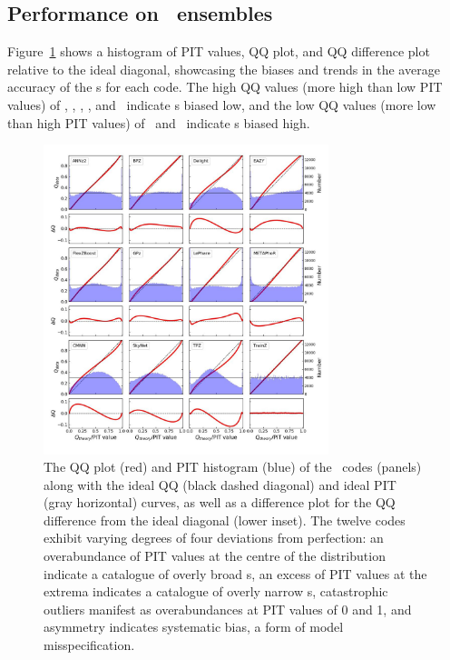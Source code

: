 
\subsection{Performance on \pzpdf\ ensembles}
\label{sec:pitqq}

Figure~\ref{fig:pitqq} shows a histogram of PIT values, QQ plot, and QQ difference plot relative to the ideal diagonal, showcasing the biases and trends in the average accuracy of the \pzpdf s for each code.
The high QQ values (more high than low PIT values) of \bpz, \cmnn, \delight, \eazy, and \gpz\ indicate \pzpdf s biased low, and the low QQ values (more low than high PIT values) of \skynet\ and \tpz\ indicate \pzpdf s biased high.

\begin{figure}
\centering
\includegraphics[width=0.74\textwidth]{fig/PITANDQQplot_12codes_crop.jpg}
\caption{The QQ plot (red) and PIT histogram (blue) of the \pzpdf\ codes (panels) along with the ideal QQ (black dashed diagonal) and ideal PIT (gray horizontal) curves, as well as a difference plot for the QQ difference from the ideal diagonal (lower inset).
The twelve codes exhibit varying degrees of four deviations from perfection: an overabundance of PIT values at the centre of the distribution indicate a catalogue of overly broad \pzpdf s, an excess of PIT values at the extrema indicates a catalogue of overly narrow \pzpdf s, catastrophic outliers manifest as overabundances at PIT values of 0 and 1, and asymmetry indicates systematic bias, a form of model misspecification.}
\label{fig:pitqq}
\end{figure}

